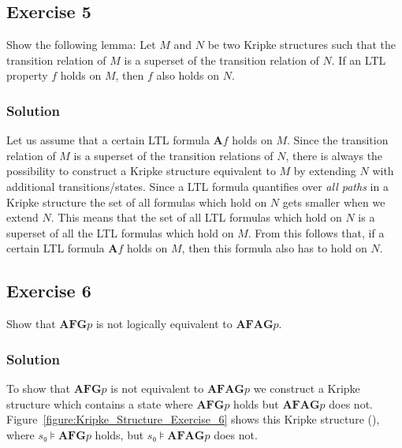 \documentclass[a4paper, 12pt]{article}
\begin{document}
\subsection{Exercise 5}

Show the following lemma: Let $M$ and $N$ be two Kripke structures such that
the transition relation of $M$ is a superset of the transition relation of
$N$. If an LTL property $f$ holds on $M$, then $f$ also holds on $N$.

\subsubsection{Solution}

Let us assume that a certain LTL formula $\mathbf{A}f$ holds on $M$. Since the
transition relation of $M$ is a superset of the transition relations of $N$,
there is always the possibility to construct a Kripke structure equivalent to
$M$ by extending $N$ with additional transitions/states. Since a LTL formula
quantifies over \emph{all paths} in a Kripke structure the set of all formulas
which hold on $N$ gets smaller when we extend $N$. This means that the set of
all LTL formulas which hold on $N$ is a superset of all the LTL formulas which
hold on $M$. From this follows that, if a certain LTL formula $\mathbf{A}f$
holds on $M$, then this formula also has to hold on $N$.

\subsection{Exercise 6}

Show that $\mathbf{AFG} p$ is not logically equivalent to $\mathbf{AFAG} p$.

\subsubsection{Solution}

To show that $\mathbf{AFG} p$ is not equivalent to $\mathbf{AFAG} p$ we
construct a Kripke structure which contains a state where $\mathbf{AFG} p$
holds but $\mathbf{AFAG} p$ does not.
Figure~\ref{figure:Kripke_Structure_Exercise_6} shows this Kripke structure
(\cite{Exercises_Formal_Methods}), where $s₀⊧\mathbf{AFG} p$ holds, but
$s₀⊧\mathbf{AFAG} p$ does not.
\end{document}
